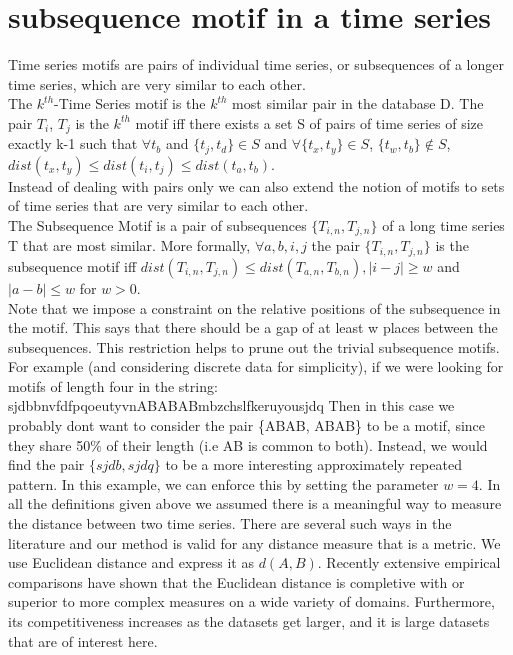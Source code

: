 \documentclass[12pt,a4paper]{article}
\begin{document}
	\section{subsequence motif in a time series}
	Time series motifs are pairs of individual time series, or subsequences of a longer time series, which are very similar to each other.
	\\ The $k^{th}$-Time Series motif is the $k^{th}$ most similar pair in the database D. The pair $T_i$, $T_j$ is the $k^{th}$ motif iff there exists a set S of pairs of time series of size exactly k-1 such that $\forall t_b$ and $\{ t_j , t_d \} \in S$ and $\forall \{ t_x , t_y \} \in S$, $ \{ t_w , t_b \} \notin S$, $dist(t_x , t_y) \leq dist(t_i , t_j) \leq dist(t_a , t_b)$.
	\\ Instead of dealing with pairs only we can also extend the notion of motifs
to sets of time series that are very similar to each other.
	\\ The Subsequence Motif is a pair of subsequences $ \{ T_{i,n} , T_{j,n} \} $ of a long time series T that are most similar. More formally, $\forall a, b, i, j$ the pair $ \{ T_{i,n} , T_{j,n} \} $ is the subsequence motif iff $dist(T_{i,n} , T_{j,n}) \leq dist(T_{a,n} , T_{b,n}), |i-j| \geq w$ and $|a-b| \leq w$ for $w>0$.
	\\ Note that we impose a constraint on the relative positions of the subsequence 
in the motif. This says that there should be a gap of at least w places between the subsequences. This restriction helps to prune out the trivial subsequence motifs. For example (and considering discrete data for simplicity), if we were looking for motifs of length four in the string: sjdbbnvfdfpqoeutyvnABABABmbzchslfkeruyousjdq  Then in this case we probably dont want to consider the pair \{ABAB, ABAB\} to be a motif, since they share 50\% of their length (i.e AB is common to both). Instead, we would find the pair $ \{ sjdb, sjdq \} $ to be a more interesting approximately repeated pattern. In this example, we can enforce this by setting the parameter $w=4$. In all the definitions given above we assumed there is a meaningful way to measure the distance between two time series. There are several such ways in the literature and our method is valid for any distance measure that is a metric. We use Euclidean distance and express it as $d(A,B)$. Recently extensive empirical comparisons have shown that the Euclidean distance is completive with or superior to more complex measures on a wide variety of domains. Furthermore, its competitiveness increases as the datasets get larger, and it is large datasets that are of interest here.
\end{document}
